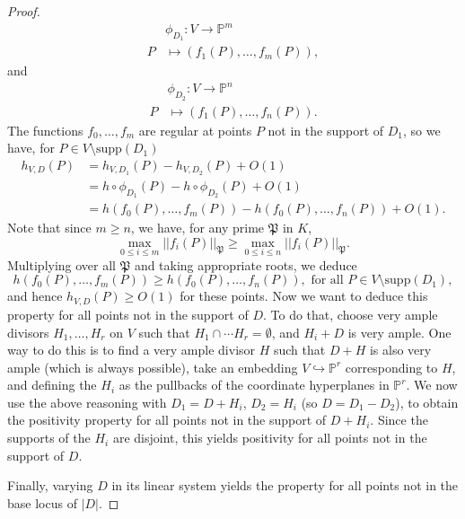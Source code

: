 \documentclass[a4paper, 12pt]{amsart}
\theoremstyle{definition}
\theoremstyle{plain}
\theoremstyle{plain}
\theoremstyle{plain}
\theoremstyle{plain}
\theoremstyle{remark}
\theoremstyle{remark}
\theoremstyle{plain}
\renewcommand{\P}{\mathfrak{P}}
\begin{document}
\begin{proof}
		\begin{align*}
			&\phi_{D_1}:V\rightarrow \mathbb{P}^m\\
			P&\mapsto(f_1(P),\ldots,f_m(P)),
		\end{align*}
		and
		\begin{align*}
			&\phi_{D_2}:V\rightarrow \mathbb{P}^n\\
			P&\mapsto(f_1(P),\ldots,f_n(P)).
		\end{align*}
		The functions $f_0,\ldots,f_m$ are regular at points $P$ not in the support of $D_1$, so we have, for $P\in V\setminus\text{supp}(D_1)$
		\begin{align*}
			h_{V,D}(P)&=h_{V,D_1}(P)-h_{V,D_2}(P)+O(1)\\
			&=h\circ\phi_{D_1}(P)-h\circ\phi_{D_2}(P)+O(1)\\
			&=h(f_0(P),\ldots,f_m(P))-h(f_0(P),\ldots,f_n(P))+O(1).
		\end{align*}
		Note that since $m\ge n$, we have, for any prime $\P$ in $K$,
		\begin{equation*}
			\max_{0\le i\le m}||f_i(P)||_\P\ge\max_{0\le i\le n}||f_i(P)||_\P.
		\end{equation*}
		Multiplying over all $\P$ and taking appropriate roots, we deduce
		\begin{equation*}
			h(f_0(P),\ldots,f_m(P))\ge h(f_0(P),\ldots,f_n(P)), \text{ for all }P\in V\setminus\text{supp}(D_1),
		\end{equation*}
		and hence $h_{V,D}(P)\ge O(1)$ for these points. Now we want to deduce this property for all points not in the support of $D$. To do that, choose very ample divisors $H_1,\ldots, H_r$ on $V$ such that $H_1\cap \cdots H_r=\emptyset$, and $H_i+D$ is very ample. One way to do this is to find a very ample divisor $H$ such that $D+H$ is also very ample (which is always possible), take an embedding $V\hookrightarrow\mathbb{P}^r$ corresponding to $H$, and defining the $H_i$ as the pullbacks of the coordinate hyperplanes in $\mathbb{P}^r$. We now use the above reasoning with $D_1=D+H_i$, $D_2=H_i$ (so $D=D_1-D_2$), to obtain the positivity property for all points not in the support of $D+H_i$. Since the supports of the $H_i$ are disjoint, this yields positivity for all points not in the support of $D$.
		
		Finally, varying $D$ in its linear system yields the property for all points not in the base locus of $|D|$.
		

\end{proof}
\end{document}
